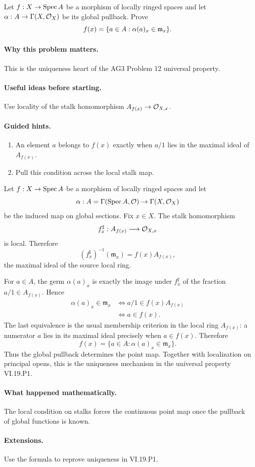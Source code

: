 \begin{problem}\label{prob:vi19-p19}
Let $f:X\to\operatorname{Spec} A$ be a morphism of locally ringed spaces and let $\alpha:A\to\Gamma(X,\mathcal O_X)$ be its global pullback. Prove
\[
f(x)=\{a\in A:\alpha(a)_x\in\mathfrak m_x\}.
\]
\end{problem}

\ifdefined\FullProblemDossiers
\paragraph{Why this problem matters.}
This is the uniqueness heart of the AG3 Problem 12 universal property.

\paragraph{Useful ideas before starting.}
Use locality of the stalk homomorphism $A_{f(x)}\to\mathcal O_{X,x}$.

\paragraph{Guided hints.}
\begin{enumerate}
\item An element $a$ belongs to $f(x)$ exactly when $a/1$ lies in the maximal ideal of $A_{f(x)}$.
\item Pull this condition across the local stalk map.
\end{enumerate}

\begin{solution}
Let \(f:X\to\operatorname{Spec} A\) be a morphism of locally ringed spaces and let
\[
\alpha:A=\Gamma(\operatorname{Spec} A,\mathcal O)\to\Gamma(X,\mathcal O_X)
\]
be the induced map on global sections.  Fix \(x\in X\).  The stalk homomorphism
\[
f_x^\sharp:A_{f(x)}\longrightarrow\mathcal O_{X,x}
\]
is local.  Therefore
\[
(f_x^\sharp)^{-1}(\mathfrak m_x)=f(x)A_{f(x)},
\]
the maximal ideal of the source local ring.

For \(a\in A\), the germ \(\alpha(a)_x\) is exactly the image under \(f_x^\sharp\) of the fraction \(a/1\in A_{f(x)}\).  Hence
\[
\begin{aligned}
\alpha(a)_x\in\mathfrak m_x
&\iff a/1\in f(x)A_{f(x)}\\
&\iff a\in f(x).
\end{aligned}
\]
The last equivalence is the usual membership criterion in the local ring \(A_{f(x)}\): a numerator \(a\) lies in its maximal ideal precisely when \(a\in f(x)\).  Therefore
\[
\boxed{f(x)=\{a\in A:\alpha(a)_x\in\mathfrak m_x\}.}
\]
Thus the global pullback determines the point map.  Together with localization on principal opens, this is the uniqueness mechanism in the universal property VI.19.P1.
\end{solution}

\paragraph{What happened mathematically.}
The local condition on stalks forces the continuous point map once the pullback of global functions is known.

\paragraph{Extensions.}
Use the formula to reprove uniqueness in VI.19.P1.
\fi
